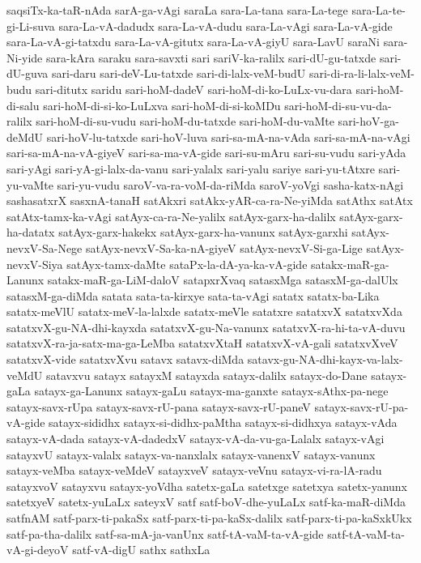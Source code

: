 {saqsiTx-ka-taR-nAda
sarA-ga-vAgi
saraLa
sara-La-tana
sara-La-tege
sara-La-te-gi-Li-suva
sara-La-vA-dadudx
sara-La-vA-dudu
sara-La-vAgi
sara-La-vA-gide
sara-La-vA-gi-tatxdu
sara-La-vA-gitutx
sara-La-vA-giyU
sara-LavU
saraNi
sara-Ni-yide
sara-kAra
saraku
sara-savxti
sari
sariV-ka-ralilx
sari-dU-gu-tatxde
sari-dU-guva
sari-daru
sari-deV-Lu-tatxde
sari-di-lalx-veM-budU
sari-di-ra-li-lalx-veM-budu
sari-ditutx
saridu
sari-hoM-dadeV
sari-hoM-di-ko-LuLx-vu-dara
sari-hoM-di-salu
sari-hoM-di-si-ko-LuLxva
sari-hoM-di-si-koMDu
sari-hoM-di-su-vu-da-ralilx
sari-hoM-di-su-vudu
sari-hoM-du-tatxde
sari-hoM-du-vaMte
sari-hoV-ga-deMdU
sari-hoV-lu-tatxde
sari-hoV-luva
sari-sa-mA-na-vAda
sari-sa-mA-na-vAgi
sari-sa-mA-na-vA-giyeV
sari-sa-ma-vA-gide
sari-su-mAru
sari-su-vudu
sari-yAda
sari-yAgi
sari-yA-gi-lalx-da-vanu
sari-yalalx
sari-yalu
sariye
sari-yu-tAtxre
sari-yu-vaMte
sari-yu-vudu
saroV-va-ra-voM-da-riMda
saroV-yoVgi
sasha-katx-nAgi
sashasatxrX
sasxnA-tanaH
satAkxri
satAkx-yAR-ca-ra-Ne-yiMda
satAthx
satAtx
satAtx-tamx-ka-vAgi
satAyx-ca-ra-Ne-yalilx
satAyx-garx-ha-dalilx
satAyx-garx-ha-datatx
satAyx-garx-hakekx
satAyx-garx-ha-vanunx
satAyx-garxhi
satAyx-nevxV-Sa-Nege
satAyx-nevxV-Sa-ka-nA-giyeV
satAyx-nevxV-Si-ga-Lige
satAyx-nevxV-Siya
satAyx-tamx-daMte
sataPx-la-dA-ya-ka-vA-gide
satakx-maR-ga-Lanunx
satakx-maR-ga-LiM-daloV
satapxrXvaq
satasxMga
satasxM-ga-dalUlx
satasxM-ga-diMda
satata
sata-ta-kirxye
sata-ta-vAgi
satatx
satatx-ba-Lika
satatx-meVlU
satatx-meV-la-lalxde
satatx-meVle
satatxre
satatxvX
satatxvXda
satatxvX-gu-NA-dhi-kayxda
satatxvX-gu-Na-vanunx
satatxvX-ra-hi-ta-vA-duvu
satatxvX-ra-ja-satx-ma-ga-LeMba
satatxvXtaH
satatxvX-vA-gali
satatxvXveV
satatxvX-vide
satatxvXvu
satavx
satavx-diMda
satavx-gu-NA-dhi-kayx-va-lalx-veMdU
satavxvu
satayx
satayxM
satayxda
satayx-dalilx
satayx-do-Dane
satayx-gaLa
satayx-ga-Lanunx
satayx-gaLu
satayx-ma-ganxte
satayx-sAthx-pa-nege
satayx-savx-rUpa
satayx-savx-rU-pana
satayx-savx-rU-paneV
satayx-savx-rU-pa-vA-gide
satayx-sididhx
satayx-si-didhx-paMtha
satayx-si-didhxya
satayx-vAda
satayx-vA-dada
satayx-vA-dadedxV
satayx-vA-da-vu-ga-Lalalx
satayx-vAgi
satayxvU
satayx-valalx
satayx-va-nanxlalx
satayx-vanenxV
satayx-vanunx
satayx-veMba
satayx-veMdeV
satayxveV
satayx-veVnu
satayx-vi-ra-lA-radu
satayxvoV
satayxvu
satayx-yoVdha
satetx-gaLa
satetxge
satetxya
satetx-yanunx
satetxyeV
satetx-yuLaLx
sateyxV
satf
satf-boV-dhe-yuLaLx
satf-ka-maR-diMda
satfnAM
satf-parx-ti-pakaSx
satf-parx-ti-pa-kaSx-dalilx
satf-parx-ti-pa-kaSxkUkx
satf-pa-tha-dalilx
satf-sa-mA-ja-vanUnx
satf-tA-vaM-ta-vA-gide
satf-tA-vaM-ta-vA-gi-deyoV
satf-vA-digU
sathx
sathxLa
}
